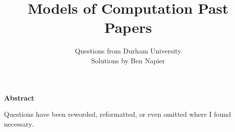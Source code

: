 \documentclass[a4paper, answers]{exam}
\title{Models of Computation Past Papers}
\author{
    Questions from Durham University \\ 
    Solutions by Ben Napier
}
\begin{document}
    \begin{titlepage}
        \maketitle
    \end{titlepage}

    \tableofcontents
    \clearpage

    \thispagestyle{empty}
    \vspace*{21.5em}
    \begin{center}
        \parbox{0.77\textwidth}{
            \noindent
            \begin{center}
                \normalsize\textbf{Abstract}
            \end{center}
            \vspace{-3pt}
            Questions have been reworded, reformatted, 
            or even omitted where I found necessary.
        }
    \end{center}
    \vspace*{\fill}

    \clearpage
    \begin{questions}
        
        
    \end{questions}
\end{document}
